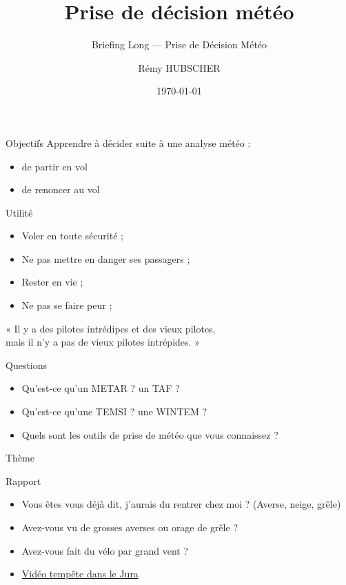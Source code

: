 \documentclass{beamer}
\author{Rémy HUBSCHER}
\begin{document}
  \title[Briefing Long — Prise de Décision Météo]{Prise de décision météo}
  \subtitle{Briefing Long — Prise de Décision Météo}
\date{\today} 

\begin{frame}[plain]
  \titlepage
\end{frame}

\begin{frame}{Objectifs}
  Apprendre à décider suite à une analyse météo :
  \begin{itemize}
    \item de partir en vol \pause
    \item de renoncer au vol
  \end{itemize}
\end{frame}

\begin{frame}{Utilité}
  \begin{itemize}
    \item Voler en toute sécurité ; \pause
    \item Ne pas mettre en danger ses passagers ; \pause
    \item Rester en vie ; \pause
    \item Ne pas se faire peur ; \pause
  \end{itemize}

  \parskip=20pt

  \begin{center}
    « Il y a des pilotes intrédipes et des vieux pilotes,\\
    mais il n'y a pas de vieux pilotes intrépides. »
  \end{center}
\end{frame}

\begin{frame}{Questions}
  \begin{itemize}
    \item Qu'est-ce qu'un METAR ? \pause un TAF ? \pause
    
    \item Qu'est-ce qu'une TEMSI ? \pause une WINTEM ? \pause
    \item Quels sont les outils de prise de météo que vous connaissez ?
  \end{itemize}  
\end{frame}

\begin{frame}{Thème}
  \tableofcontents
\end{frame}

\begin{frame}{Rapport}
  \begin{itemize}
    \item Vous êtes vous déjà dit, j'aurais du rentrer chez moi ? \pause (Averse, neige, grêle)
    \item Avez-vous vu de grosses averses ou orage de grêle ?
    \item Avez-vous fait du vélo par grand vent ?
    \item \href{https://www.youtube.com/watch?v=zIhQlqZ7UN8}{Vidéo tempête dans le Jura}
  \end{itemize}  
\end{frame}
\end{document}
